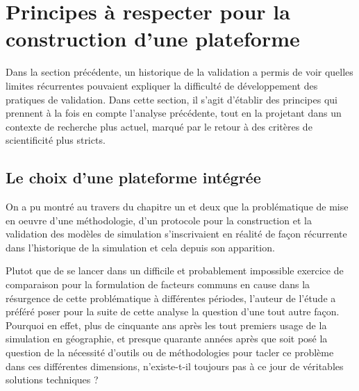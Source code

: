
\section{Principes à respecter pour la construction d'une plateforme }
\label{sec:constante_problematique}



Dans la section précédente, un historique de la validation a permis de voir quelles limites récurrentes pouvaient expliquer la difficulté de développement des pratiques de validation. Dans cette section, il s'agit d'établir des principes qui prennent à la fois en compte l'analyse précédente, tout en la projetant dans un contexte de recherche plus actuel, marqué par le retour à des critères de scientificité plus stricts.

\subsection{Le choix d'une plateforme intégrée}
\label{ssec:choix_plateforme_integree}


On a pu montré au travers du chapitre un et deux que la problématique de mise  en oeuvre d'une méthodologie, d'un protocole pour la construction et la validation des modèles de simulation s'inscrivaient en réalité de façon récurrente dans l'historique de la simulation et cela depuis son apparition. 

Plutot que de se lancer dans un difficile et probablement impossible exercice de comparaison pour la formulation de facteurs communs en cause dans la résurgence de cette problématique à différentes périodes, l'auteur de l'étude a préféré poser pour la suite de cette analyse la question d'une tout autre façon. Pourquoi en effet, plus de cinquante ans après les tout premiers usage de la simulation en géographie, et presque quarante années après que soit posé la question de la nécessité d'outils ou de méthodologies pour tacler ce problème dans ces différentes dimensions, n'existe-t-il toujours pas à ce jour de véritables solutions techniques ?

